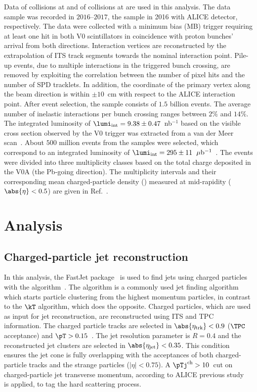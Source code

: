 \documentclass[ALICE,manyauthors]{cernphprep}
\begin{document}
Data of \pp collisions at \thirteen and of \pPb collisions at \fivenn are used in this analysis.
The \pp data sample was recorded in $2016$--$2017$, the \pPb sample in 2016 with ALICE detector, respectively.
The data were collected with a minimum bias (MB) trigger requiring at least one hit in both V0 scintillators in coincidence with proton bunches' arrival from both directions.
Interaction vertices are reconstructed by the extrapolation of ITS track segments towards the nominal interaction point.
Pile-up events, due to multiple interactions in the triggered bunch crossing, are removed by exploiting the correlation between the number of pixel hits and the number of SPD tracklets.
In addition, the coordinate of the primary vertex along the beam direction is within $\pm 10$~cm with respect to the ALICE interaction point.
After event selection, the \pp sample consists of $1.5$ billion events.
The average number of inelastic interactions per bunch crossing ranges between $2\%$ and $14\%$.
The integrated luminosity of $\lumi_{\rm int} = 9.38\pm 0.47$~nb$^{-1}$ based on the visible cross section observed by the V0 trigger was extracted from a van der Meer scan~\cite{ALICE-PUBLIC-2016-002}.
About $500$ million events from the \pPb samples were selected, which correspond to an integrated luminosity of $\lumi_{\rm int} = 295 \pm 11 $~$\mu{\rm b}^{-1}$~\cite{ALICE:2019oyn}.
The \pPb events were divided into three multiplicity classes based on the total charge deposited in the V0A (the Pb-going direction).
The multiplicity intervals and their corresponding mean charged-particle density (\dndeta) measured at mid-rapidity ($\abs{\eta} < 0.5$) are given in Ref.~\cite{Adam:2015pza}. 

\section{Analysis}%
\label{sec:Analysis}

\subsection{Charged-particle jet reconstruction}%
\label{sec:JetRec}

In this analysis, the FastJet package~\cite{Cacciari:2011ma} is used to find jets using charged particles with the \akT algorithm~\cite{Cacciari:2008gp}.
The \akT algorithm is a commonly used jet finding algorithm which starts particle clustering from the highest momentum particles, in contrast to the $\kT$ algorithm, which does the opposite.
Charged particles, which are used as input for jet reconstruction, are reconstructed using ITS and TPC information.
The charged particle tracks are selected in $\abs{\eta_{\rm trk}} < 0.9$ ($\TPC$ acceptance) and $\pT> 0.15$~\GeVc.
The jet resolution parameter is $R = 0.4$ and the reconstructed jet clusters are selected in $\abs{\eta_{\rm jet}} < 0.35$.
This condition ensures the jet cone is fully overlapping with the acceptances of both charged-particle tracks and the strange particles ($|\eta| < 0.75$).
A $\pTj^{\rm ch} > 10$~\GeVc cut on charged-particle jet transverse momentum, according to ALICE previous study~\cite{Acharya:2021oaa} is applied, to tag the hard scattering process.
\end{document}
